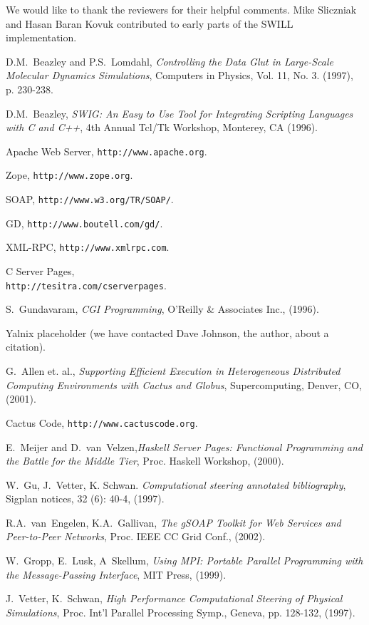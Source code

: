 We would like to thank the reviewers for their helpful comments.   Mike Sliczniak and Hasan Baran Kovuk
contributed to early parts of the SWILL implementation.   

\begin{thebibliography}{99}
 D.M.~Beazley and P.S.~Lomdahl, {\em Controlling the Data Glut in Large-Scale Molecular Dynamics Simulations}, Computers in Physics, Vol. 11, No. 3. (1997), p. 230-238. 

 D.M.~Beazley, {\em SWIG: An Easy to Use Tool for Integrating Scripting Languages with C and C++}, 4th Annual Tcl/Tk Workshop, Monterey, CA (1996).

 Apache Web Server, {\tt http://www.apache.org}.

 Zope, {\tt http://www.zope.org}.

 SOAP, {\tt http://www.w3.org/TR/SOAP/}.

 GD, {\tt http://www.boutell.com/gd/}.

 XML-RPC, {\tt http://www.xmlrpc.com}.

 C Server Pages,\\
 {\tt  http://tesitra.com/cserverpages}.

 S.~Gundavaram, {\em CGI Programming}, O'Reilly \& Associates Inc., (1996).

 Yalnix placeholder (we have contacted Dave Johnson, the author, about a citation).

 G.~Allen et. al., {\em Supporting Efficient Execution in Heterogeneous Distributed Computing Environments with Cactus and Globus}, Supercomputing, Denver, CO, (2001).

 Cactus Code, {\tt http://www.cactuscode.org}.

 E.~Meijer and D.~van~Velzen,{\em Haskell Server Pages: Functional Programming and the Battle for the Middle Tier}, Proc. Haskell Workshop, (2000).

 W.~Gu, J.~Vetter, K. Schwan. {\em Computational steering 
annotated bibliography},  Sigplan notices, 32 (6): 40-4, (1997). 

 R.A.~van~Engelen, K.A.~Gallivan, {\em The gSOAP Toolkit for Web Services and Peer-to-Peer Networks}, Proc. IEEE CC Grid Conf., (2002).

 W.~Gropp, E.~Lusk, A~Skellum, {\em Using MPI: Portable Parallel Programming with the Message-Passing Interface}, MIT Press, (1999).

 J.~Vetter, K.~Schwan, {\em High Performance Computational 
Steering of Physical Simulations}, Proc. Int'l Parallel Processing Symp., 
Geneva, pp. 128-132, (1997). 

\end{thebibliography}


